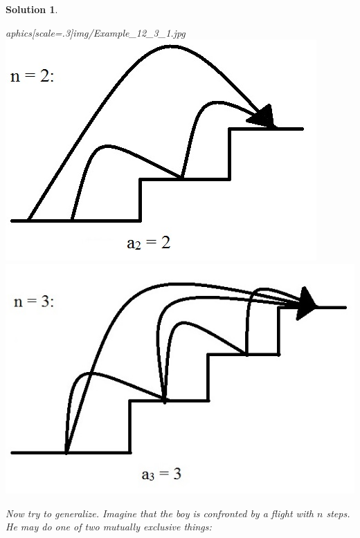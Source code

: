 \documentclass[12pt, letterpaper, onecolumn, conference, final]{IEEEtran}
\theoremstyle{definition}
\theoremstyle{plain}
\newtheorem{solution}{Solution}[section]
\begin{document}
\begin{solution}
\begin{center}
aphics[scale=.3]{img/Example_12_3_1.jpg} \includegraphics[scale=.3]{img/Example_12_3_2.jpg} \includegraphics[scale=.3]{img/Example_12_3_3.jpg}
\end{center}
Now try to generalize. Imagine that the boy is confronted by a flight with $n$ steps. He may do one of two mutually exclusive things:
\begin{itemize}


\end{itemize}
\end{solution}
\end{document}
